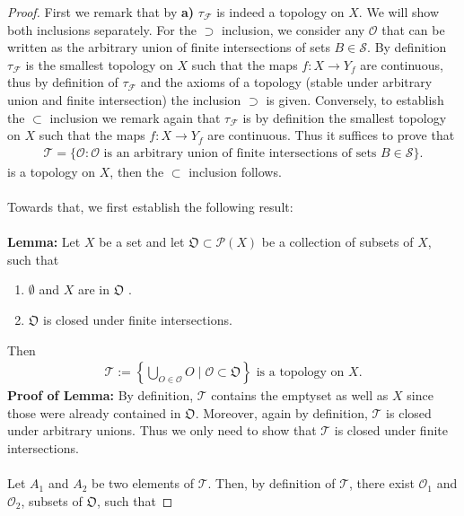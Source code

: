 \documentclass[12pt,a4paper]{article}
\begin{document}
\begin{proof}
First we remark that by \textbf{a)} $\tau_\mathcal{F}$ is indeed a topology on $X$. We will show both inclusions separately. For the $\supset$ inclusion, we consider any $\mathcal{O}$ that can be written as the arbitrary union of finite intersections of sets $B \in \mathcal{S}$. By definition $\tau_\mathcal{F}$ is the smallest topology on $X$ such that the maps $f: X \to Y_f$ are continuous, thus by definition of $\tau_\mathcal{F}$ and the axioms of a topology (stable under arbitrary union and finite intersection) the inclusion $\supset$ is given. 
\newpage
Conversely, to establish the $\subset$ inclusion we remark again  that $\tau_\mathcal{F}$ is by definition the smallest topology on $X$ such that the maps $f:X \to Y_f$ are continuous. Thus it suffices to prove that 
\begin{align*}
\mathcal{T}=\lbrace \mathcal{O}: \mathcal{O} \text{ is an arbitrary union of finite intersections of sets } B \in \mathcal{S} \rbrace. 
\end{align*} 
is a topology on $X$, then the $\subset$ inclusion follows. 
\\\\
Towards that, we first establish the following result:
\\
\\
\textbf{Lemma:} Let $X$ be a set and let $\mathfrak{O} \subset \mathcal{P}(X)$ be a collection of subsets of $X$, such that
\begin{enumerate}
\item $\emptyset$ and $X$ are in $\mathfrak{O}$ .
\item $\mathfrak{O}$ is closed under finite intersections.
\end{enumerate}
Then 
\begin{align*}
\mathcal{T}:= \left\{ \bigcup_{O \in \mathcal{O}} O \mid \mathcal{O} \subset \mathfrak{O} \right\} \text{ is a topology on $X$}.
\end{align*}
\textbf{Proof of Lemma:} By definition, $\mathcal{T}$ contains the emptyset as well as $X$ since those were already contained in  $\mathfrak{O}$. Moreover, again by definition, $\mathcal{T}$ is closed under arbitrary unions. Thus we only need to show that $\mathcal{T}$ is closed under finite intersections. 
\\\\
Let $A_1$ and $A_2$ be two elements of $\mathcal{T}$. Then, by definition of $\mathcal{T}$, there exist $\mathcal{O}_1$ and $\mathcal{O}_2$, subsets of $\mathfrak{O}$, such that

\end{proof}
\end{document}
